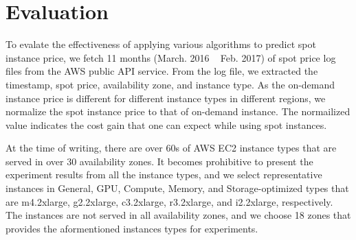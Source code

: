 \documentclass[graybox]{svmult}
\begin{document}
\section{Evaluation}
To evalate the effectiveness of applying various algorithms to predict spot instance price, we fetch 11 months (March. 2016 ~ Feb. 2017) of spot price log files from the AWS public API service. From the log file, we extracted the timestamp, spot price, availability zone, and instance type. As the on-demand instance price is different for different instance types in different regions, we normalize the spot instance price to that of on-demand instance. The normailized value indicates the cost gain that one can expect while using spot instances.

At the time of writing, there are over 60s of AWS EC2 instance types that are served in over 30 availability zones. It becomes prohibitive to present the experiment results from all the instance types, and we select representative instances in General, GPU, Compute, Memory, and Storage-optimized types that are m4.2xlarge, g2.2xlarge, c3.2xlarge, r3.2xlarge, and i2.2xlarge, respectively. The instances are not served in all availability zones, and we choose 18 zones that provides the aformentioned instances types for experiments.
\end{document}
